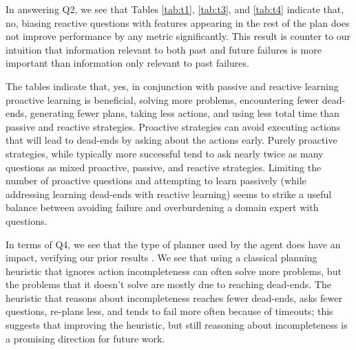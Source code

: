 \documentclass[letterpaper]{article}
\def\citep#1{\cite{#1}}
\begin{document}
In answering Q2, we see that Tables \ref{tab:t1}, \ref{tab:t3}, and \ref{tab:t4}
indicate that, no, biasing reactive questions with features appearing in the
rest of the plan does not improve performance by any metric significantly.  This
result is counter to our intuition that information relevant to both past and
future failures is more important than information only relevant to past
failures.  

The tables indicate that, yes, in conjunction with passive and reactive learning
proactive learning is beneficial, solving more problems, encountering fewer
dead-ends, generating fewer plans, taking less actions, and using less total
time than passive and reactive strategies.  Proactive strategies can avoid
executing actions that will lead to dead-ends by asking about the actions early.
Purely proactive strategies, while typically more successful tend to ask nearly
twice as many questions as mixed proactive, passive, and reactive strategies. 
Limiting the number of proactive questions and attempting to learn passively
(while addressing learning dead-ends with reactive learning) seems to strike a
useful balance between avoiding failure and overburdening a domain expert with
questions.

In terms of Q4, we see that the type of planner used by the agent does have an
impact, verifying our prior results \citep{bryce-icaps11}.  We see that using a
classical planning heuristic that ignores action incompleteness can often solve
more problems, but the problems that it doesn't solve are mostly due to reaching
dead-ends.  The heuristic that reasons about incompleteness reaches fewer
dead-ends, asks fewer questions, re-plans less, and tends to fail more often
because of timeouts; this suggests that improving the heuristic, but still reasoning about incompleteness is a promising
direction for future work.
\end{document}
